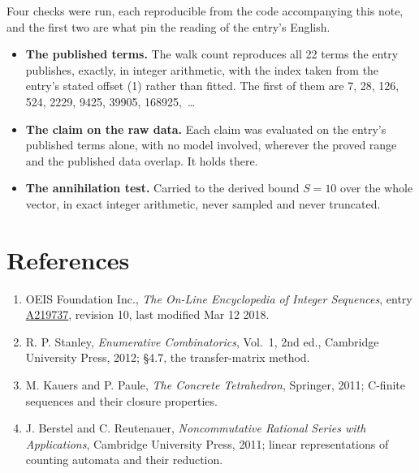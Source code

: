 \documentclass[11pt]{article}
\theoremstyle{definition}
\begin{document}
Four checks were run, each reproducible from the code accompanying this note, and the first two are what pin the reading of the entry's English.

\begin{itemize}

\item {\bfseries The published terms.} The walk count reproduces all 22 terms the entry publishes, exactly, in integer arithmetic, with the index taken from the entry's stated offset (1) rather than fitted. The first of them are 7, 28, 126, 524, 2229, 9425, 39905, 168925,~\dots

\item {\bfseries The claim on the raw data.} Each claim was evaluated on the entry's published terms alone, with no model involved, wherever the proved range and the published data overlap. It holds there.

\item {\bfseries The annihilation test.} Carried to the derived bound $S = 10$ over the whole vector, in exact integer arithmetic, never sampled and never truncated.

\end{itemize}

\section{References}

\begin{enumerate}

\item OEIS Foundation Inc., \emph{The On-Line Encyclopedia of Integer Sequences}, entry \href{https://oeis.org/A219737}{A219737}, revision 10, last modified Mar 12 2018.

\item R. P. Stanley, \emph{Enumerative Combinatorics}, Vol.~1, 2nd ed., Cambridge University Press, 2012; \S4.7, the transfer-matrix method.

\item M. Kauers and P. Paule, \emph{The Concrete Tetrahedron}, Springer, 2011; C-finite sequences and their closure properties.

\item J. Berstel and C. Reutenauer, \emph{Noncommutative Rational Series with Applications}, Cambridge University Press, 2011; linear representations of counting automata and their reduction.

\end{enumerate}
\end{document}
